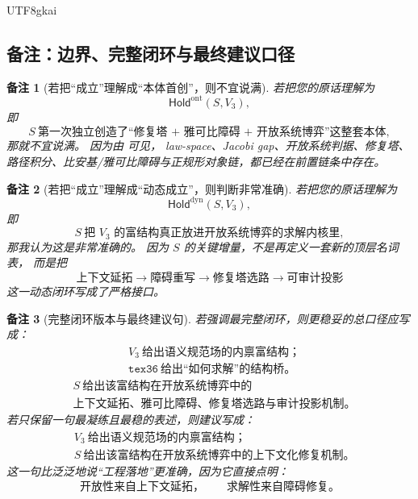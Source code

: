 \documentclass[12pt]{article}
\newtheorem{remark}{备注}[section]
\begin{document}
\begin{CJK*}{UTF8}{gkai}
\subsection{备注：边界、完整闭环与最终建议口径}
\label{subsec:tex37-ch19-remarks}

\begin{remark}[若把“成立”理解成“本体首创”，则不宜说满]
若把您的原话理解为
\[
  \mathsf{Hold}^{\mathrm{ont}}(S,V_3),
\]
即
\[
  S\ \text{第一次独立创造了“修复塔 + 雅可比障碍 + 开放系统博弈”这整套本体},
\]
那就不宜说满。
因为由 \cite{GaoZhengAppVol3,RepoTex23OpenSystemGame,RepoTex36HomotopyTwistBijection,RepoTex38JacobiBianchiRepair} 可见，
law-space、Jacobi gap、开放系统判据、修复塔、路径积分、比安基/雅可比障碍与正规形对象链，都已经在前置链条中存在。
\end{remark}

\begin{remark}[若把“成立”理解成“动态成立”，则判断非常准确]
若把您的原话理解为
\[
  \mathsf{Hold}^{\mathrm{dyn}}(S,V_3),
\]
即
\[
  S\ \text{把 }V_3\text{ 的富结构真正放进开放系统博弈的求解内核里},
\]
那我认为这是非常准确的。
因为 $S$ 的关键增量，不是再定义一套新的顶层名词表，
而是把
\[
  \text{上下文延拓}
  \to
  \text{障碍重写}
  \to
  \text{修复塔选路}
  \to
  \text{可审计投影}
\]
这一动态闭环写成了严格接口。
\end{remark}

\begin{remark}[完整闭环版本与最终建议句]
若强调最完整闭环，则更稳妥的总口径应写成：
\[
  \boxed{
    \begin{aligned}
      &V_3\ \text{给出语义规范场的内禀富结构；}\\
      &\texttt{tex36}\ \text{给出“如何求解”的结构桥。}
    \end{aligned}
  }
\]
\[
  \boxed{
    \begin{aligned}
      &S\ \text{给出该富结构在开放系统博弈中的}\\
      &\text{上下文延拓、雅可比障碍、修复塔选路与审计投影机制。}
    \end{aligned}
  }
\]
若只保留一句最凝练且最稳的表述，则建议写成：
\[
  \boxed{
    \begin{aligned}
      &V_3\ \text{给出语义规范场的内禀富结构；}\\
      &S\ \text{给出该富结构在开放系统博弈中的上下文化修复机制。}
    \end{aligned}
  }
\]
这一句比泛泛地说“工程落地”更准确，因为它直接点明：
\[
  \text{开放性来自上下文延拓，}
  \qquad
  \text{求解性来自障碍修复。}
\]
\end{remark}


\end{CJK*}
\end{document}
